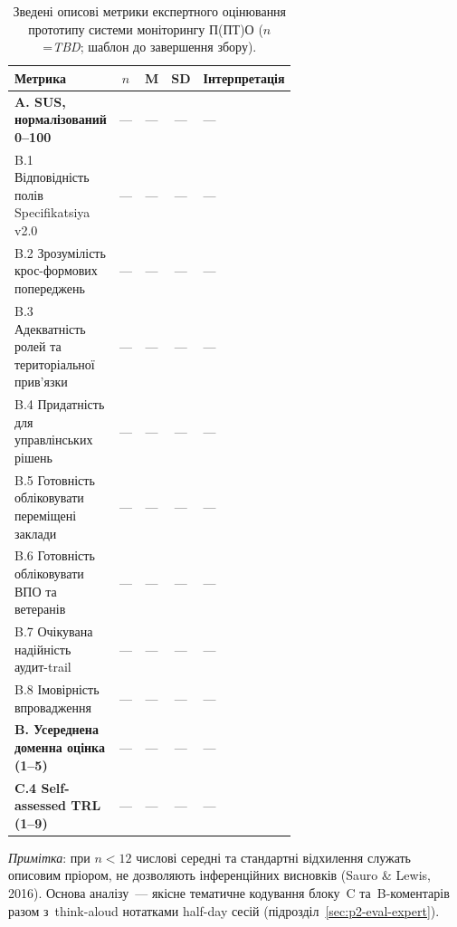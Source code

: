 %
%
%

\begin{table}[htbp]
\centering
\caption{Зведені описові метрики експертного оцінювання прототипу системи моніторингу П(ПТ)О ($n$=\textit{TBD}; шаблон до завершення збору).}
\label{tab:expert_eval_results}
\small
\setlength\tabcolsep{4pt}
\renewcommand{\arraystretch}{1.1}
\begin{tabular}{|p{0.42\linewidth}|c|c|c|p{0.20\linewidth}|}
\hline
\textbf{Метрика} & $n$ & \textbf{M} & \textbf{SD} & \textbf{Інтерпретація} \\
\hline
\textbf{A. SUS, нормалізований 0--100} & --- & --- & --- & --- \\
\hline
B.1 Відповідність полів Specifikatsiya v2.0 & --- & --- & --- & --- \\
\hline
B.2 Зрозумілість крос-формових попереджень & --- & --- & --- & --- \\
\hline
B.3 Адекватність ролей та територіальної прив'язки & --- & --- & --- & --- \\
\hline
B.4 Придатність для управлінських рішень & --- & --- & --- & --- \\
\hline
B.5 Готовність обліковувати переміщені заклади & --- & --- & --- & --- \\
\hline
B.6 Готовність обліковувати ВПО та ветеранів & --- & --- & --- & --- \\
\hline
B.7 Очікувана надійність аудит-trail & --- & --- & --- & --- \\
\hline
B.8 Імовірність впровадження & --- & --- & --- & --- \\
\hline
\textbf{B. Усереднена доменна оцінка (1--5)} & --- & --- & --- & --- \\
\hline
\textbf{C.4 Self-assessed TRL (1--9)} & --- & --- & --- & --- \\
\hline
\end{tabular}

\medskip

\footnotesize
\textit{Примітка}: при $n{<}12$ числові середні та стандартні відхилення служать описовим пріором, не дозволяють інференційних висновків (Sauro \& Lewis, 2016). Основа аналізу~--- якісне тематичне кодування блоку~C та~B-коментарів разом з~think-aloud нотатками half-day сесій (підрозділ~\ref{sec:p2-eval-expert}).

\normalsize
\end{table}
